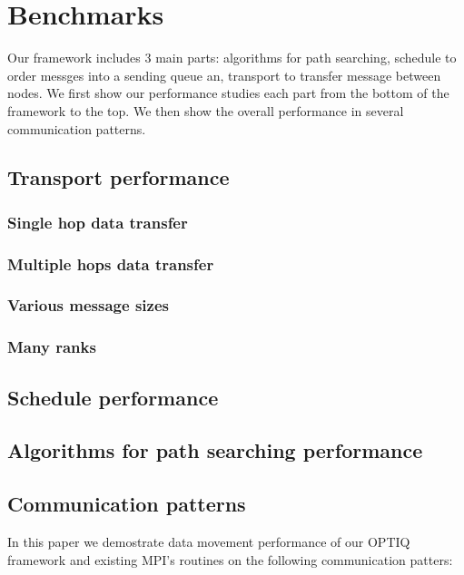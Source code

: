 \section{Benchmarks}
Our framework includes 3 main parts: algorithms for path searching, schedule to order messges into a sending queue an, transport to transfer message between nodes. We first show our performance studies each part from the bottom of the framework to the top. We then show the overall performance in several communication patterns.

\subsection{Transport performance}

\subsubsection{Single hop data transfer}

\subsubsection{Multiple hops data transfer}

\subsubsection{Various message sizes}

\subsubsection{Many ranks}

\subsection{Schedule performance}

\subsection{Algorithms for path searching performance }

\subsection{Communication patterns}
In this paper we demostrate data movement performance of our OPTIQ framework and existing MPI's routines on the following communication patters:

